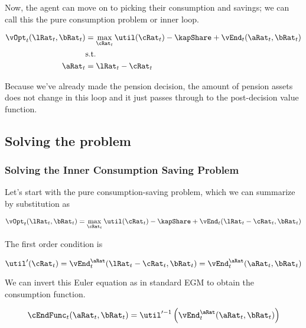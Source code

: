 \documentclass[\econtexRoot/SequentialEGM]{subfiles}
\begin{document}
Now, the agent can move on to picking their consumption and savings; we can call this
the pure consumption problem or inner loop.

\begin{equation}
        \begin{split}
                \vOpt_{t}(\lRat_{t}, \bRat_{t}) & = \max_{\cRat_{t}}
                \util(\cRat_{t}) - \kapShare  + \vEnd_{t}(\aRat_{t}, \bRat_{t}) \\
                & \text{s.t.} \\
                \aRat_{t} & = \lRat_{t} - \cRat_{t} \\
        \end{split}
\end{equation}

Because we've already made the pension decision, the amount of pension assets
does not change in this loop and it just passes through to the post-decision
value function.

\subsection{Solving the problem}

\subsubsection{Solving the Inner Consumption Saving Problem}

Let's start with the pure consumption-saving problem, which we can summarize by
substitution as

\begin{equation}
        \vOpt_{t}(\lRat_{t}, \bRat_{t}) = \max_{\cRat_{t}} \util(\cRat_{t}) - \kapShare +
        \vEnd_{t}(\lRat_{t} - \cRat_{t}, \bRat_{t})
\end{equation}

The first order condition is

\begin{equation}
        \util'(\cRat_{t}) = \vEnd_{t}^{\aRat}(\lRat_{t}-\cRat_{t}, \bRat_{t}) =
        \vEnd_{t}^{\aRat}(\aRat_{t}, \bRat_{t})
\end{equation}

We can invert this Euler equation as in standard EGM to obtain the consumption
function.

\begin{equation}
        \cEndFunc_{t}(\aRat_{t}, \bRat_{t}) =
        \util'^{-1}\left(\vEnd_{t}^{\aRat}(\aRat_{t}, \bRat_{t})\right)
\end{equation}
\end{document}
